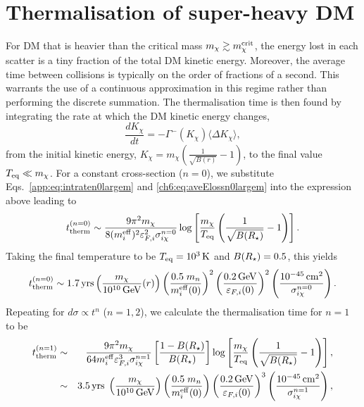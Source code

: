 \section{Thermalisation of super-heavy DM}
\label{app:sec:thermsuperheavy}



For DM that is heavier than the critical mass  $m_\chi\gtrsim m_\chi^{\rm crit}$,
the energy lost in each scatter is a tiny fraction of the total DM kinetic energy. Moreover, the average time between collisions is typically on the order of fractions of a second. This warrants the use of a continuous approximation in this regime rather than performing the discrete summation. The thermalisation time is then found by integrating the rate at which the DM kinetic energy changes, 
\begin{equation}
    \frac{dK_\chi}{dt} = -\Gamma^{-}(K_\chi) \langle\Delta K_\chi\rangle,  
    \label{app:eq:contttherm}
\end{equation}
from the initial kinetic energy, $K_\chi=m_\chi\left(\frac{1}{\sqrt{B(r)}}-1\right)$, to the final value $T_{\rm eq}\ll m_\chi$. For a constant cross-section ($n=0$), we substitute  Eqs.~\ref{app:eq:intraten0largem} and \ref{ch6:eq:aveElossn0largem} into the expression above leading to
\begin{equation}
    t_{\rm therm}^{(n=0)} \sim \frac{9 \pi^2 m_\chi}{8 (m_i^{\rm eff})^2 \varepsilon_{F,i}^2 \sigma_{i\chi}^{n=0}}\log\left[\frac{m_\chi}{T_{\rm eq}}\left(\frac{1}{\sqrt{B(R_\star)}}-1\right)\right].
    \label{app:eq:tthemheavy0}
\end{equation}
Taking the final temperature to be $T_{\rm eq}=10^3{\rm \,K}$ and $B(R_\star)=0.5$, this yields 
\begin{equation}
    t_{\rm therm}^{(n=0)} \sim 1.7  {\rm \,yrs} \left(\frac{m_\chi }{10^{10}{\rm \,GeV}}(r)\right)\left(\frac{0.5\;m_n}{m_i^{\rm eff}(0)}\right)^{2}\left(\frac{0.2{\rm \,GeV}}{\varepsilon_{F,i}(0)}\right)^{2}\left(\frac{10^{-45}{\rm \,cm}^2}{\sigma_{i\chi}^{n=0}}\right).    
\end{equation}
%
Repeating for $d\sigma\propto t^n$ ($n=1,2$), we calculate the thermalisation time for $n=1$ to be
\begin{eqnarray}
    t_{\rm therm}^{(n=1)} &\sim& \frac{9\pi^2 m_\chi}{ 64 m_i^{\rm eff} \varepsilon_{F,i}^3 \sigma_{i\chi}^{n=1}}\left[\frac{1-B(R_\star)}{B(R_\star)}\right] \log\left[\frac{m_\chi}{T_{\rm eq}} \left(\frac{1}{\sqrt{B(R_\star)}}-1\right)\right],\\
    &\sim& 3.5 {\rm \,yrs}\; \left(\frac{m_\chi}{10^{10} {\rm \,GeV}}\right)\left(\frac{0.5\;m_n}{m_i^{\rm eff}(0)}\right) \left(\frac{0.2{\rm \,GeV}}{\varepsilon_{F,i}(0)}\right)^{3}\left(\frac{10^{-45}{\rm \,cm}^2}{\sigma_{i\chi}^{n=1}}\right),
\end{eqnarray}
